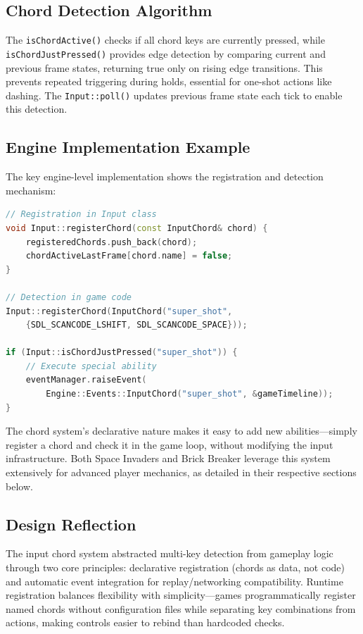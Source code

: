 \documentclass[12pt]{article}
\begin{document}
\subsection{Chord Detection Algorithm}

The \texttt{isChordActive()} checks if all chord keys are currently pressed, while \texttt{isChordJustPressed()} provides edge detection by comparing current and previous frame states, returning true only on rising edge transitions. This prevents repeated triggering during holds, essential for one-shot actions like dashing. The \texttt{Input::poll()} updates previous frame state each tick to enable this detection.

\subsection{Engine Implementation Example}

The key engine-level implementation shows the registration and detection mechanism:

\begin{lstlisting}[language=C++]
// Registration in Input class
void Input::registerChord(const InputChord& chord) {
    registeredChords.push_back(chord);
    chordActiveLastFrame[chord.name] = false;
}

// Detection in game code
Input::registerChord(InputChord("super_shot", 
    {SDL_SCANCODE_LSHIFT, SDL_SCANCODE_SPACE}));

if (Input::isChordJustPressed("super_shot")) {
    // Execute special ability
    eventManager.raiseEvent(
        Engine::Events::InputChord("super_shot", &gameTimeline));
}
\end{lstlisting}

The chord system's declarative nature makes it easy to add new abilities—simply register a chord and check it in the game loop, without modifying the input infrastructure. Both Space Invaders and Brick Breaker leverage this system extensively for advanced player mechanics, as detailed in their respective sections below.

\subsection{Design Reflection}

The input chord system abstracted multi-key detection from gameplay logic through two core principles: declarative registration (chords as data, not code) and automatic event integration for replay/networking compatibility. Runtime registration balances flexibility with simplicity—games programmatically register named chords without configuration files while separating key combinations from actions, making controls easier to rebind than hardcoded checks.
\end{document}
